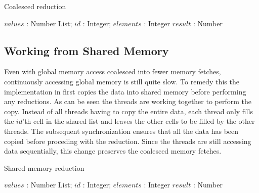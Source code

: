 \begin{algorithm}
  \caption{Coalesced reduction}
  \label{alg:coalescedReduct}
  \begin{algorithmic}
              {$values$ : Number List; $id$ : Integer; $elements$ : Integer}
              {$result$ : Number}
              {
                  \ENDIF
                  \SYNC
                \ENDWHILE
                \ENDIF
              }
  \end{algorithmic}
\end{algorithm}



\subsection{Working from Shared Memory}\label{sec:usingSharedMem}

Even with global memory access coalesced into fewer memory fetches, continuously
accessing global memory is still quite slow. To remedy this the implementation
in  first copies the data into shared memory before
performing any reductions. As can be seen the threads are working together to
perform the copy. Instead of all threads having to copy the entire data, each
thread only fills the $id$'th cell in the shared list and leaves the other cells
to be filled by the other threads. The subsequent synchronization ensures that
all the data has been copied before proceding with the reduction. Since the
threads are still accessing data sequentially, this change preserves the
coalesced memory fetches.

\begin{algorithm}
  \caption{Shared memory reduction}
  \label{alg:sharedReduct}
  \begin{algorithmic}
              {$values$ : Number List; $id$ : Integer; $elements$ : Integer}
              {$result$ : Number}
              {
                \SYNC
                  \ENDIF
                  \SYNC
                \ENDWHILE
                \ENDIF
              }
  \end{algorithmic}
\end{algorithm}

